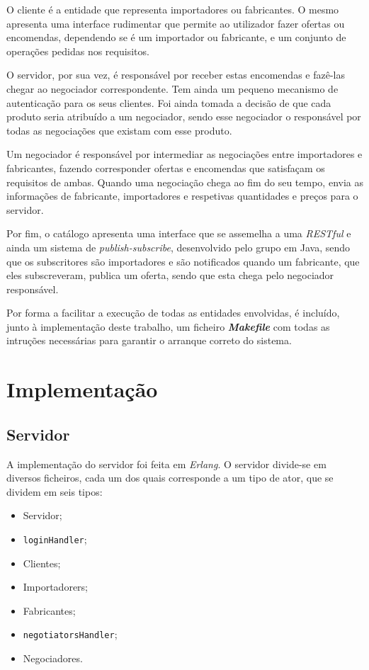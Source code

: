 \documentclass[a4paper]{report}
\begin{document}
	O cliente é a entidade que representa importadores ou fabricantes. 
	O mesmo apresenta uma interface rudimentar que permite ao utilizador fazer ofertas ou encomendas, dependendo se é um importador ou fabricante, e um conjunto de operações pedidas nos requisitos.
	
	O servidor, por sua vez, é responsável por receber estas encomendas e fazê-las chegar ao negociador correspondente. Tem ainda um pequeno mecanismo de autenticação para os seus clientes.
	Foi ainda tomada a decisão de que cada produto seria atribuído a um negociador, sendo esse negociador o responsável por todas as negociações que existam com esse produto.
	
	Um negociador é responsável por intermediar as negociações entre importadores e fabricantes, fazendo corresponder ofertas e encomendas que satisfaçam os requisitos de ambas.
	Quando uma negociação chega ao fim do seu tempo, envia as informações de fabricante, importadores e respetivas quantidades e preços para o servidor.

	Por fim, o catálogo apresenta uma interface que se assemelha a uma \textit{RESTful} e ainda um sistema de \textit{publish-subscribe}, desenvolvido pelo grupo em Java, sendo que os subscritores são importadores e são notificados quando um fabricante, que eles subscreveram, publica um oferta, sendo que esta chega pelo negociador responsável.

	Por forma a facilitar a execução de todas as entidades envolvidas, é incluído, junto à implementação deste trabalho, um ficheiro \textbf{\textit{Makefile}} com todas as intruções necessárias para garantir o arranque correto do sistema.

	\section{Implementação}
	
	\subsection{Servidor}
	A implementação do servidor foi feita em \textit{Erlang}. O servidor divide-se em diversos ficheiros, cada um dos quais corresponde a um tipo de ator, que se dividem em seis tipos:
	\begin{itemize}
		\item Servidor;
		\item \texttt{loginHandler};
		\item Clientes;
		\item Importadorers;
		\item Fabricantes;
		\item \texttt{negotiatorsHandler};
		\item Negociadores.
	\end{itemize}
\end{document}

